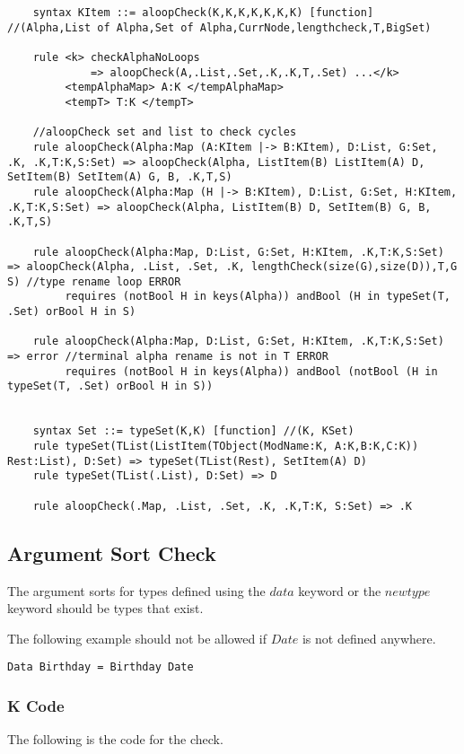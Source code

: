 \begin{lstlisting}
    syntax KItem ::= aloopCheck(K,K,K,K,K,K,K) [function] //(Alpha,List of Alpha,Set of Alpha,CurrNode,lengthcheck,T,BigSet)

    rule <k> checkAlphaNoLoops
             => aloopCheck(A,.List,.Set,.K,.K,T,.Set) ...</k>
         <tempAlphaMap> A:K </tempAlphaMap>
         <tempT> T:K </tempT>

    //aloopCheck set and list to check cycles
    rule aloopCheck(Alpha:Map (A:KItem |-> B:KItem), D:List, G:Set, .K, .K,T:K,S:Set) => aloopCheck(Alpha, ListItem(B) ListItem(A) D, SetItem(B) SetItem(A) G, B, .K,T,S)
    rule aloopCheck(Alpha:Map (H |-> B:KItem), D:List, G:Set, H:KItem, .K,T:K,S:Set) => aloopCheck(Alpha, ListItem(B) D, SetItem(B) G, B, .K,T,S)

    rule aloopCheck(Alpha:Map, D:List, G:Set, H:KItem, .K,T:K,S:Set) => aloopCheck(Alpha, .List, .Set, .K, lengthCheck(size(G),size(D)),T,G S) //type rename loop ERROR
         requires (notBool H in keys(Alpha)) andBool (H in typeSet(T, .Set) orBool H in S) 

    rule aloopCheck(Alpha:Map, D:List, G:Set, H:KItem, .K,T:K,S:Set) => error //terminal alpha rename is not in T ERROR
         requires (notBool H in keys(Alpha)) andBool (notBool (H in typeSet(T, .Set) orBool H in S))


    syntax Set ::= typeSet(K,K) [function] //(K, KSet)
    rule typeSet(TList(ListItem(TObject(ModName:K, A:K,B:K,C:K)) Rest:List), D:Set) => typeSet(TList(Rest), SetItem(A) D)
    rule typeSet(TList(.List), D:Set) => D

    rule aloopCheck(.Map, .List, .Set, .K, .K,T:K, S:Set) => .K
\end{lstlisting}

\subsection{Argument Sort Check}
The argument sorts for types defined using the $data$ keyword or the $newtype$ keyword should be types that exist.

The following example should not be allowed if $Date$ is not defined anywhere.
\begin{lstlisting}
Data Birthday = Birthday Date
\end{lstlisting}

\subsubsection{K Code}
The following is the code for the check.

